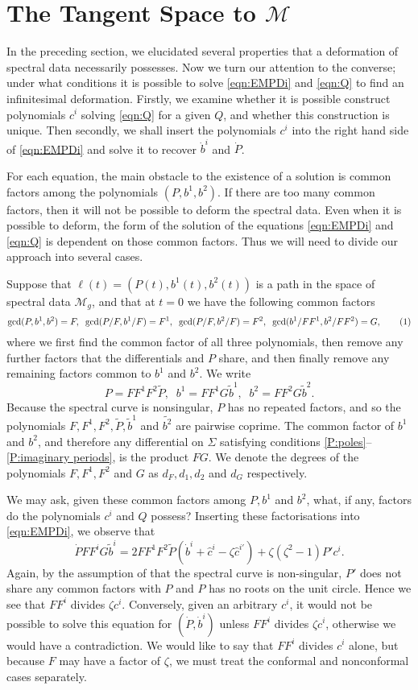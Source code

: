 \section{The Tangent Space to $\mathcal{M}$}
\label{sec:tangent space}

In the preceding section, we elucidated several properties that a deformation of spectral data necessarily possesses. Now we turn our attention to the converse; under what conditions it is possible to solve \eqref{eqn:EMPDi} and \eqref{eqn:Q} to find an infinitesimal deformation. Firstly, we examine whether it is possible construct polynomials $c^i$ solving \eqref{eqn:Q} for a given $Q$, and whether this construction is unique. Then secondly, we shall insert the polynomials $c^i$ into the right hand side of \eqref{eqn:EMPDi} and solve it to recover $\dot{b}^i$ and $\dot{P}$.

For each equation, the main obstacle to the existence of a solution is common factors among the polynomials $(P,b^1,b^2)$. If there are too many common factors, then it will not be possible to deform the spectral data. Even when it is possible to deform, the form of the solution of the equations \eqref{eqn:EMPDi} and \eqref{eqn:Q} is dependent on those common factors. Thus we will need to divide our approach into several cases.

Suppose that $\ell(t) = (P(t),b^1(t),b^2(t))$ is a path in the space of spectral data $\mathcal{M}_g$, and that at $t=0$ we have the following common factors
\[
\gcd(P,b^1,b^2) = F,\;\; \gcd(P/F,b^1/F) = F^1,\;\; \gcd(P/F,b^2/F) = F^2,\;\; \gcd(b^1/FF^1, b^2/FF^2) = G,
\labelthis{eqn:common factors}
\]
where we first find the common factor of all three polynomials, then remove any further factors that the differentials and $P$ share, and then finally remove any remaining factors common to $b^1$ and $b^2$. We write
\[
P = F F^1 F^2 \tilde{P},\;\; b^1 = F F^1 G \tilde{b}^1,\;\; b^2 = F F^2 G \tilde{b}^2.
\]
Because the spectral curve is nonsingular, $P$ has no repeated factors, and so the polynomials $F,F^1,F^2,\tilde{P}, \tilde{b}^1$ and $\tilde{b^2}$ are pairwise coprime. The common factor of $b^1$ and $b^2$, and therefore any differential on $Σ$ satisfying conditions \ref{P:poles}--\ref{P:imaginary periods}, is the product $FG$. We denote the degrees of the polynomials $F, F^1, F^2$ and $G$ as $d_F,d_1,d_2$ and $d_G$ respectively.

We may ask, given these common factors among $P, b^1$ and $b^2$, what, if any, factors do the polynomials $c^i$ and $Q$ possess? Inserting these factorisations into \eqref{eqn:EMPDi}, we observe that
\[
\dot{P} F F^i G \tilde{b}^i = 2 F F^1 F^2 \tilde{P} (\dot{b}^i + \hat{c}^i - ζ\hat{c}^{i\prime}) + ζ(ζ^2-1 ) P'c^i.
\]
Again, by the assumption of that the spectral curve is non-singular, $P'$ does not share any common factors with $P$ and $P$ has no roots on the unit circle. Hence we see that $FF^i$ divides $ζc^i$. Conversely, given an arbitrary $c^i$, it would not be possible to solve this equation for $(\dot{P},\dot{b}^i)$ unless $FF^i$ divides $ζc^i$, otherwise we would have a contradiction. We would like to say that $FF^i$ divides $c^i$ alone, but because $F$ may have a factor of $ζ$, we must treat the conformal and nonconformal cases separately.

